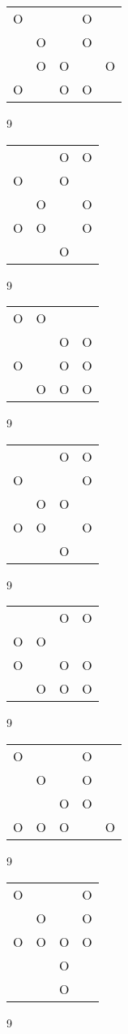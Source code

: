 \begin{tabular}{|m{0.2cm}m{0.2cm}m{0.2cm}m{0.2cm}m{0.2cm}|}\hline
O& & &O& \\
 &O& &O& \\
 &O&O& &O\\
O& &O&O& \\
\hline\end{tabular}9
\begin{tabular}{|m{0.2cm}m{0.2cm}m{0.2cm}m{0.2cm}|}\hline
 & &O&O\\
O& &O& \\
 &O& &O\\
O&O& &O\\
 & &O& \\
\hline\end{tabular}9
\begin{tabular}{|m{0.2cm}m{0.2cm}m{0.2cm}m{0.2cm}|}\hline
O&O& & \\
 & &O&O\\
O& &O&O\\
 &O&O&O\\
\hline\end{tabular}9
\begin{tabular}{|m{0.2cm}m{0.2cm}m{0.2cm}m{0.2cm}|}\hline
 & &O&O\\
O& & &O\\
 &O&O& \\
O&O& &O\\
 & &O& \\
\hline\end{tabular}9
\begin{tabular}{|m{0.2cm}m{0.2cm}m{0.2cm}m{0.2cm}|}\hline
 & &O&O\\
O&O& & \\
O& &O&O\\
 &O&O&O\\
\hline\end{tabular}9
\begin{tabular}{|m{0.2cm}m{0.2cm}m{0.2cm}m{0.2cm}m{0.2cm}|}\hline
O& & &O& \\
 &O& &O& \\
 & &O&O& \\
O&O&O& &O\\
\hline\end{tabular}9
\begin{tabular}{|m{0.2cm}m{0.2cm}m{0.2cm}m{0.2cm}|}\hline
O& & &O\\
 &O& &O\\
O&O&O&O\\
 & &O& \\
 & &O& \\
\hline\end{tabular}9
